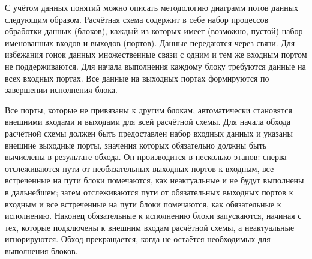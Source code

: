 С учётом данных понятий можно описать методологию диаграмм потов данных следующим образом. Расчётная схема содержит в себе набор процессов обработки данных (блоков), каждый из которых имеет (возможно, пустой) набор именованных входов и выходов (портов). Данные передаются через связи. Для избежания гонок данных множественные связи с одним и тем же входным портом не поддерживаются. Для начала выполнения каждому блоку требуются данные на всех входных портах. Все данные на выходных портах формируются по завершении исполнения блока.\cite{Nazarenko2015}

Все порты, которые не привязаны к другим блокам, автоматически становятся внешними входами и выходами для всей расчётной схемы. Для начала обхода расчётной схемы должен быть предоставлен набор входных данных и указаны внешние выходные порты, значения которых обязательно должны быть вычислены в результате обхода. Он производится в несколько этапов: сперва отслеживаются пути от необязательных выходных портов к входным, все встреченные на пути блоки помечаются, как неактуальные и не будут выполнены в дальнейшем; затем отслеживаются пути от обязательных выходных портов к входным и все встреченные на пути блоки помечаются, как обязательные к исполнению. Наконец обязательные к исполнению блоки запускаются, начиная с тех, которые подключены к внешним входам расчётной схемы, а неактуальные игнорируются. Обход прекращается, когда не остаётся необходимых для выполнения блоков. \cite{Nazarenko2015}

\newpage
